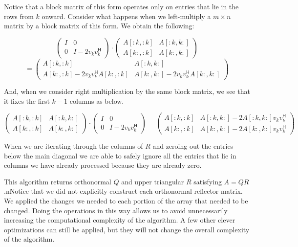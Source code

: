 Notice that a block matrix of this form operates only on entries that lie in the rows from $k$ onward.
Consider what happens when we left-multiply a $m \times n$ matrix by a block matrix of this form.
We obtain the following:

\[
\begin{pmatrix}
I & 0 \\
0 & I - 2 v_k v_k^\mathsf{H}
\end{pmatrix}
\cdot
\begin{pmatrix}
A[:k,:k] & A[:k,k:] \\
A[k:,:k] & A[k:,k:]
\end{pmatrix}
\]
\[
=
\begin{pmatrix}
A[:k,:k] & A[:k,k:] \\
A[k:,:k] - 2 v_k v_k^\mathsf{H} A[k:,:k] & A[k:,k:] - 2 v_k v_k^\mathsf{H} A[k:,k:]
\end{pmatrix}
\]

And, when we consider right multiplication by the same block matrix, we see that it fixes the first $k-1$ columns as below.

\[
\begin{pmatrix}
A[:k,:k] & A[:k,k:] \\
A[k:,:k] & A[k:,k:]
\end{pmatrix}
\cdot
\begin{pmatrix}
I & 0 \\
0 & I - 2 v_k v_k^\mathsf{H}
\end{pmatrix}
=
\begin{pmatrix}
A[:k,:k] & A[:k,k:] - 2  A[:k,k:] v_k v_k^\mathsf{H} \\
A[k:,:k] & A[k:,k:] - 2 A[k:,k:] v_k v_k^\mathsf{H}
\end{pmatrix}
\]

When we are iterating through the columns of $R$ and zeroing out the entries below the main diagonal we are able to safely ignore all the entries that lie in columns we have already processed because they are already zero.

This algorithm returns orthonormal $Q$ and upper triangular $R$ satisfying $A = QR$.nNotice that we did not explicitly construct each orthonormal reflector matrix. We applied the changes we needed to each portion of the array that needed to be changed. Doing the operations in this way allows us to avoid unnecessarily increasing the computational complexity of the algorithm.
A few other clever optimizations can still be applied, but they will not change the overall complexity of the algorithm.

